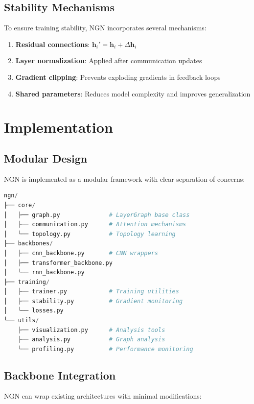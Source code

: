 \documentclass[11pt]{article}
\begin{document}
\subsection{Stability Mechanisms}

To ensure training stability, NGN incorporates several mechanisms:

\begin{enumerate}
    \item \textbf{Residual connections}: $\mathbf{h}_i' = \mathbf{h}_i + \Delta\mathbf{h}_i$
    \item \textbf{Layer normalization}: Applied after communication updates
    \item \textbf{Gradient clipping}: Prevents exploding gradients in feedback loops
    \item \textbf{Shared parameters}: Reduces model complexity and improves generalization
\end{enumerate}

\section{Implementation}

\subsection{Modular Design}

NGN is implemented as a modular framework with clear separation of concerns:

\begin{lstlisting}[language=Python, caption=NGN Core Components]
ngn/
├── core/
│   ├── graph.py              # LayerGraph base class
│   ├── communication.py      # Attention mechanisms
│   └── topology.py           # Topology learning
├── backbones/
│   ├── cnn_backbone.py       # CNN wrappers
│   ├── transformer_backbone.py
│   └── rnn_backbone.py
├── training/
│   ├── trainer.py            # Training utilities
│   ├── stability.py          # Gradient monitoring
│   └── losses.py
└── utils/
    ├── visualization.py      # Analysis tools
    ├── analysis.py           # Graph analysis
    └── profiling.py          # Performance monitoring
\end{lstlisting}

\subsection{Backbone Integration}

NGN can wrap existing architectures with minimal modifications:
\end{document}
